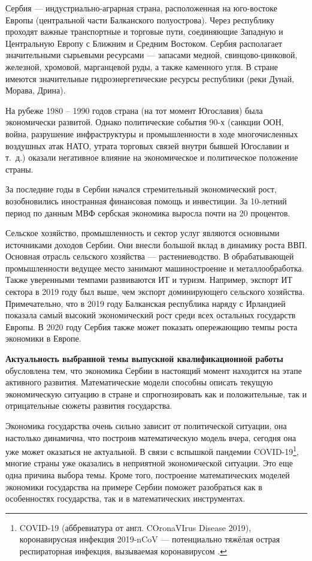 \Introduction

Сербия --- индустриально-аграрная страна, расположенная на юго-востоке Европы (центральной части Балканского полуострова).
Через республику проходят важные транспортные и торговые пути, соединяющие Западную и Центральную Европу с Ближним и Средним Востоком.
Сербия располагает значительными сырьевыми ресурсами --- запасами медной, свинцово-цинковой, железной, хромовой, марганцевой руды, а также каменного угля.
В стране имеются значительные гидроэнергетические ресурсы республики (реки Дунай, Морава, Дрина).

На рубеже 1980 -- 1990 годов страна (на тот момент Югославия) была экономически развитой.
Однако политические события 90-х (санкции ООН, война, разрушение инфраструктуры и промышленности в ходе многочисленных воздушных атак НАТО, утрата торговых связей внутри бывшей Югославии и т.~д.) оказали негативное влияние на экономическое и политическое положение страны.

За последние годы в Сербии начался стремительный экономический рост, возобновились иностранная финансовая помощь и инвестиции.
За 10-летний период по данным МВФ сербская экономика выросла почти на 20 процентов.

Сельское хозяйство, промышленность и сектор услуг являются основными источниками доходов Сербии.
Они внесли большой вклад в динамику роста ВВП.
Основная отрасль сельского хозяйства --- растениеводство.
В обрабатывающей промышленности ведущее место занимают машиностроение и металлообработка.
Также уверенными темпами развиваются ИТ и туризм.
Например, экспорт ИТ сектора в 2019 году был выше, чем экспорт доминирующего сельского хозяйства.
Примечательно, что в 2019 году Балканская республика наряду с Ирландией показала самый высокий экономический рост среди всех остальных государств Европы.
В 2020 году Сербия также может показать опережающию темпы роста экономики в Европе.

\textbf{Актуальность выбранной темы выпускной квалификационной работы } обусловлена тем, что экономика Сербии в настоящий момент находится на этапе активного развития.
Математические модели способны описать текущую экономическую ситуацию в стране и спрогнозировать как и положительные, так и отрицательные сюжеты развития государства.

Экономика государства очень сильно зависит от политической ситуации, она настолько динамична, что построив математическую модель вчера, сегодня она уже может оказаться не актуальной. В связи с вспышкой пандемии COVID-19\footnote{COVID-19 (аббревиатура от англ. COronaVIrus Disease 2019), коронавирусная инфекция 2019-nCoV --- потенциально тяжёлая острая респираторная инфекция, вызываемая коронавирусом \cite{wiki_covid}.}, многие страны уже оказались в неприятной экономической ситуации.
Это еще одна причина выбора темы.
Кроме того, построение математических моделей экономики государства на примере Сербии поможет разобраться как в особенностях государства, так и в математических инструментах.

